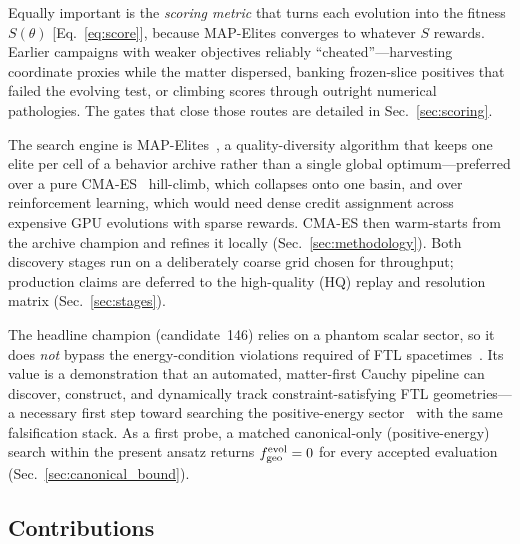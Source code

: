 \documentclass[twocolumn,floatfix,aps,prd,nofootinbib]{revtex4-2}
\begin{document}
Equally important is the \emph{scoring metric} that turns each evolution into
the fitness $S(\theta)$ [Eq.~\eqref{eq:score}], because MAP-Elites converges to
whatever $S$ rewards. Earlier campaigns with weaker objectives reliably
``cheated''---harvesting coordinate proxies while the matter dispersed, banking
frozen-slice positives that failed the evolving test, or climbing scores
through outright numerical pathologies. The gates that close those routes are
detailed in Sec.~\ref{sec:scoring}.

The search engine is MAP-Elites~\cite{mouret15}, a quality-diversity algorithm
that keeps one elite per cell of a behavior archive rather than a single global
optimum---preferred over a pure CMA-ES~\cite{hansen01} hill-climb, which
collapses onto one basin, and over reinforcement learning, which would need
dense credit assignment across expensive GPU evolutions with sparse rewards.
CMA-ES then warm-starts from the archive champion and refines it locally
(Sec.~\ref{sec:methodology}). Both discovery stages run on a deliberately
coarse grid chosen for throughput; production claims are deferred to the
high-quality (HQ) replay and resolution matrix (Sec.~\ref{sec:stages}).

The headline champion (candidate~146) relies on a phantom scalar sector, so it
does \emph{not} bypass the energy-condition violations required of FTL
spacetimes~\cite{olum98,gaowald00,santiago2022}. Its value is a demonstration
that an automated, matter-first Cauchy pipeline can discover, construct, and
dynamically track constraint-satisfying FTL geometries---a necessary first step
toward searching the positive-energy sector~\cite{lentz21,fell21} with the same
falsification stack. As a first probe, a matched canonical-only
(positive-energy) search within the present ansatz returns
$f_{\rm geo}^{\rm evol}=0$ for every accepted evaluation
(Sec.~\ref{sec:canonical_bound}).

\subsection{Contributions}
\label{subsec:contributions}
\end{document}
